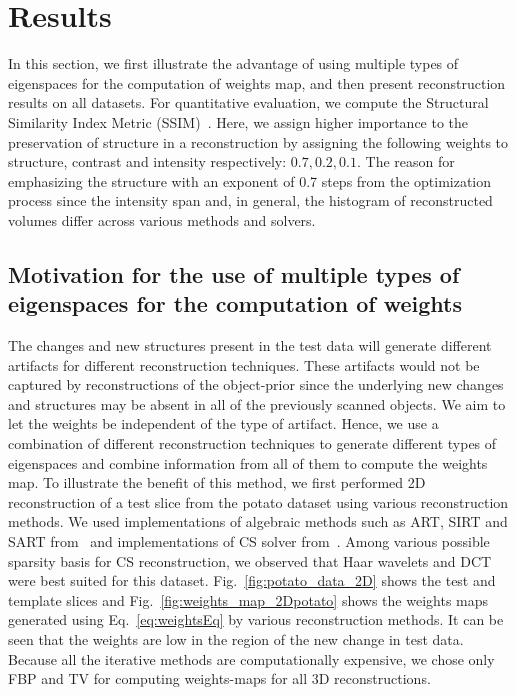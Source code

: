 \documentclass[journal]{IEEEtran}
\begin{document}
\section{Results}
\label{sec:results_spatially_varying_prior}


In this section, we first illustrate the advantage of using multiple
types of eigenspaces for the computation of weights map, and then
present reconstruction results on all datasets. For quantitative
evaluation, we compute the Structural Similarity Index Metric
(SSIM)~\cite{ssim}. Here, we assign higher importance to the
preservation of structure in a reconstruction by assigning the
following weights to structure, contrast and intensity respectively:
$0.7,0.2,0.1$. The reason for emphasizing the structure with an
exponent of 0.7 steps from the optimization process since the
intensity span and, in general, the histogram of reconstructed volumes
differ across various methods and solvers. 


\subsection{Motivation for the use of multiple types of eigenspaces for the computation of weights}

The changes and new structures present in the test data will generate
different artifacts for different reconstruction techniques. These
artifacts would not be captured by reconstructions of the object-prior
since the underlying new changes and structures may be absent in all
of the previously scanned objects. We aim to let the weights be
independent of the type of artifact. Hence, we use a combination of
different reconstruction techniques to generate different types of
eigenspaces and combine information from all of them to compute the
weights map. To illustrate the benefit of this method, we first performed
2D reconstruction of a test slice from the potato dataset using
various reconstruction methods. We used implementations of algebraic
methods such as ART, SIRT and SART from~\cite{AIR_tools} and
implementations of CS solver from~\cite{l1ls}. Among various possible
sparsity basis for CS reconstruction, we observed that Haar wavelets
and DCT were best suited for this
dataset. Fig.~\ref{fig:potato_data_2D} shows the test and template
slices and Fig.~\ref{fig:weights_map_2Dpotato} shows the weights maps
generated using Eq.~\ref{eq:weightsEq} by various reconstruction
methods. It can be seen that the weights are low in the region of the
new change in test data. Because all the iterative methods are
computationally expensive, we chose only FBP and TV for computing
weights-maps for all 3D reconstructions.
\end{document}
